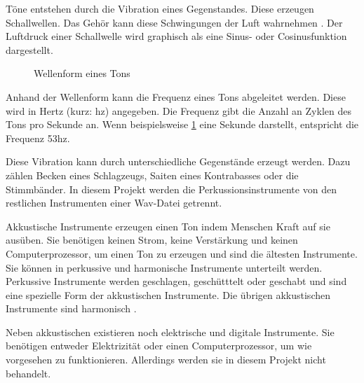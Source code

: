 Töne entstehen durch die Vibration eines Gegenstandes. Diese erzeugen Schallwellen. Das Gehör kann diese Schwingungen der Luft wahrnehmen \parencite{signaltoene}. Der Luftdruck einer Schallwelle wird graphisch als eine Sinus- oder Cosinusfunktion dargestellt.

\begin{figure}[h]
    \centering
    \caption{Wellenform eines Tons}
    \label{wav_sound}
\end{figure}
\par

Anhand der Wellenform kann die Frequenz eines Tons abgeleitet werden. Diese wird in Hertz (kurz: hz) angegeben. Die Frequenz gibt die Anzahl an Zyklen des Tons pro Sekunde an. Wenn beispielsweise \cref{wav_sound} eine Sekunde darstellt, entspricht die Frequenz 53hz.

Diese Vibration kann durch unterschiedliche Gegenstände erzeugt werden. Dazu zählen Becken eines Schlagzeugs, Saiten eines Kontrabasses oder die Stimmbänder. In diesem Projekt werden die Perkussionsinstrumente von den restlichen Instrumenten einer Wav-Datei getrennt. 

\par

Akkustische Instrumente erzeugen einen Ton indem Menschen Kraft auf sie ausüben. Sie benötigen keinen Strom, keine Verstärkung und keinen Computerprozessor, um einen Ton zu erzeugen und sind die ältesten Instrumente. Sie können in perkussive und harmonische Instrumente unterteilt werden. Perkussive Instrumente werden geschlagen, geschütttelt oder geschabt und sind eine spezielle Form der akkustischen Instrumente. Die übrigen akkustischen Instrumente sind harmonisch \parencite{acoustic_electric_digital_instruments}.

\par

Neben akkustischen existieren noch elektrische und digitale Instrumente. Sie benötigen entweder Elektrizität oder einen Computerprozessor, um wie vorgesehen zu funktionieren. Allerdings werden sie in diesem Projekt nicht behandelt.

